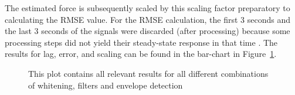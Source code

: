 The estimated force is subsequently scaled by this scaling factor preparatory to calculating the RMSE value. For the RMSE calculation, the first 3 seconds and the last 3 seconds of the signals were discarded (after processing) because some processing steps did not yield their steady-state response in that time \cite{transient_response}. The results for lag, error, and scaling can be found in the bar-chart in Figure~\ref{fig:result_all_lagerrorscaling}. 

\begin{figure}[h!t]
	\begin{center}
	\noindent{}
	\end{center}
	\caption{This plot contains all relevant results for all different combinations of whitening, filters and envelope detection}
	\label{fig:result_all_lagerrorscaling}
\end{figure}

